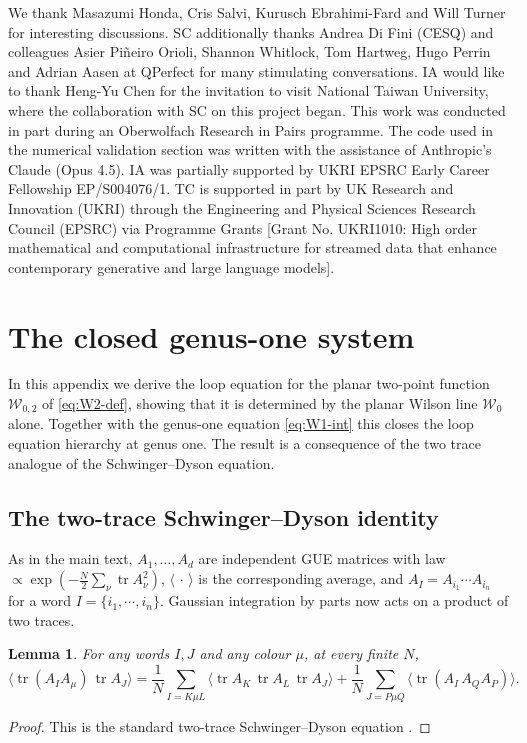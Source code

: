 \documentclass[11pt,a4paper]{article}
\newtheorem{lemma}[theorem]{Lemma}
\DeclareMathOperator{\tr}{tr}
\newcommand{\cW}{\mathcal{W}}
\begin{document}
We thank Masazumi Honda, Cris Salvi, Kurusch Ebrahimi-Fard and Will Turner for interesting discussions. SC additionally thanks Andrea Di Fini (CESQ) and colleagues Asier Pi\~neiro Orioli, Shannon Whitlock, Tom Hartweg, Hugo Perrin and Adrian Aasen at QPerfect for many stimulating conversations. IA would like to thank Heng-Yu Chen for the invitation to visit National Taiwan University, where the collaboration with SC on this project began. This work was conducted in part during an Oberwolfach Research in Pairs programme. The code used in the numerical validation section was written with the assistance of Anthropic's Claude (Opus 4.5). IA was partially supported by UKRI EPSRC Early Career Fellowship EP/S004076/1. TC is supported in part by UK Research and Innovation (UKRI) through the Engineering and Physical Sciences Research Council (EPSRC) via Programme Grants [Grant No. UKRI1010: High order mathematical and computational infrastructure for streamed data that enhance contemporary generative and large language models].




\appendix


\section{The closed genus-one system}
\label{app:closed}


In this appendix we derive the loop equation for the planar two-point function $\cW_{0,2}$ of \eqref{eq:W2-def}, showing that it is determined by the planar Wilson line $\cW_0$ alone. Together with the genus-one equation \eqref{eq:W1-int} this closes the loop equation hierarchy at genus one. The result is a consequence of the two trace analogue of the Schwinger--Dyson equation.


\subsection{The two-trace Schwinger--Dyson identity}

As in the main text, $A_1,\dots,A_d$ are independent GUE matrices with law $\propto\exp(-\tfrac N2\sum_\nu\tr A_\nu^2)$, $\langle\,\cdot\,\rangle$ is the corresponding average, and $A_I=A_{i_1}\cdots A_{i_n}$ for a word $I=\{i_1,\cdots,i_n\}$. Gaussian integration by parts now acts on a product of two traces.

\begin{lemma}\label{lem:two-trace}
For any words $I,J$ and any colour $\mu$, at every finite $N$,
\begin{equation}\label{eq:two-trace}
  \bigl\langle\tr(A_I A_\mu)\,\tr A_J\bigr\rangle = \frac1N\sum_{I=K\mu L}\bigl\langle\tr A_K\,\tr A_L\,\tr A_J\bigr\rangle + \frac1N\sum_{J=P\mu Q}\bigl\langle\tr(A_I\,A_Q A_P)\bigr\rangle.
\end{equation}
\end{lemma}
\begin{proof}
This is the standard two-trace Schwinger--Dyson equation \cite{migdal1983loop,ambjorn1990multiloop,eynard2016counting}.
\end{proof}
\end{document}
